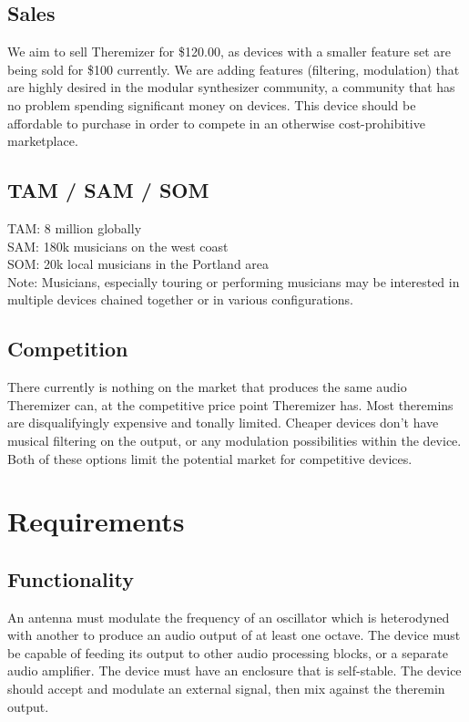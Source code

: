 \documentclass[a4paper,12pt]{article}
\begin{document}
	\subsection*{Sales}
	We aim to sell Theremizer for \$120.00, as devices with a smaller feature set are being sold for \$100 currently. We are adding features (filtering, modulation) that are highly desired in the modular synthesizer community, a community that has no problem spending significant money on devices. This device should be affordable to purchase in order to compete in an otherwise cost-prohibitive marketplace.
	\subsection*{TAM / SAM / SOM}
	TAM: 8 million globally \\
	SAM: 180k musicians on the west coast \\ 
	SOM: 20k local musicians in the Portland area \\
	
	Note: Musicians, especially touring or performing musicians may be interested in multiple devices chained together or in various configurations.
	\subsection*{Competition}
	There currently is nothing on the market that produces the same audio Theremizer can, at the competitive price point Theremizer has. Most theremins are disqualifyingly expensive and tonally limited. Cheaper devices don't have musical filtering on the output, or any modulation possibilities within the device. Both of these options limit the potential market for competitive devices. 
	
	\section*{Requirements}
	\subsection*{Functionality}
	An antenna must modulate the frequency of an oscillator which is heterodyned with another to produce an audio output of at least one octave. The device must be capable of feeding its output to other audio processing blocks, or a separate audio amplifier. The device must have an enclosure that is self-stable. The device should accept and modulate an external signal, then mix against the theremin output.
\end{document}
